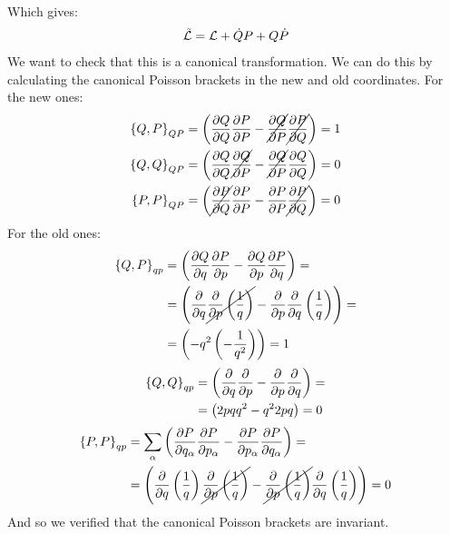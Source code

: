Which gives:
\begin{equation}
    \tilde{\mathcal{L}} = \mathcal{L} + \dot{Q}P + Q\dot{P}
\end{equation}
We want to check that this is a canonical transformation. We can do this by calculating the canonical Poisson brackets in the new and old coordinates. For the new ones:
\begin{equation}
    \begin{split}
        \pb{Q}{P}_{QP} &= \left(\pdv{Q}{Q} \pdv{P}{P} - \cancel{\pdv{Q}{P}} \cancel{\pdv{P}{Q}} \right) = 1\\
        \pb{Q}{Q}_{QP} &= \left(\pdv{Q}{Q} \cancel{\pdv{Q}{P}} - \cancel{\pdv{Q}{P}} \pdv{Q}{Q} \right) = 0\\
        \pb{P}{P}_{QP} &= \left(\cancel{\pdv{P}{Q}} \pdv{P}{P}  -  \pdv{P}{P} \cancel{\pdv{P}{Q}}\right) = 0
    \end{split}
\end{equation}
For the old ones:
\begin{equation}
    \begin{split}
        \pb{Q}{P}_{qp} &= \left(\pdv{Q}{q} \pdv{P}{p} - \pdv{Q}{p} \pdv{P}{q} \right) = \\
        &= \left(\pdv{}{q}(pq^2) \cancel{\pdv{}{p}\left(\dfrac{1}{q}\right)} - \pdv{}{p}(pq^2) \pdv{}{q}\left(\dfrac{1}{q}\right) \right) = \\
        &= \left(- q^2  \left(-\dfrac{1}{q^2}\right) \right) = 1
    \end{split}
\end{equation}
\begin{equation}
    \begin{split}
        \pb{Q}{Q}_{qp} &= \left(\pdv{}{q}(pq^2) \pdv{}{p}(pq^2) - \pdv{}{p}(pq^2) \pdv{}{q}(pq^2) \right) = \\
        &= \left(2pq  q^2 - q^2  2pq \right) = 0
    \end{split}
\end{equation}
\begin{equation}
    \begin{split}
        \pb{P}{P}_{qp} &= \bigsum_{\alpha} \left(\pdv{P}{q_{\alpha}} \pdv{P}{p_{\alpha}} - \pdv{P}{p_{\alpha}} \pdv{P}{q_{\alpha}} \right) = \\
        &= \left(\pdv{}{q}\left(\dfrac{1}{q}\right) \cancel{\pdv{}{p}\left(\dfrac{1}{q}\right)} - \cancel{\pdv{}{p}\left(\dfrac{1}{q}\right)} \pdv{}{q}\left(\dfrac{1}{q}\right) \right) = 0
    \end{split}
\end{equation}
And so we verified that the canonical Poisson brackets are invariant.
